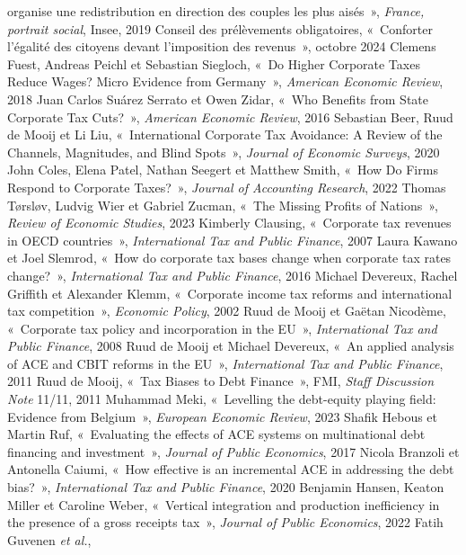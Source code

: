 \documentclass[11pt,a4paper]{article}
\begin{document}
{organise une redistribution en direction des couples les plus aisés~», \emph{France, portrait
social}, Insee, 2019 \textbullet{} Conseil des prélèvements obligatoires, «~Conforter l'égalité des
citoyens devant l'imposition des revenus~», octobre 2024 \textbullet{} Clemens Fuest, Andreas Peichl et Sebastian Siegloch, «~Do Higher
Corporate Taxes Reduce Wages? Micro Evidence from Germany~», \emph{American Economic Review}, 2018
\textbullet{} Juan Carlos Suárez Serrato et Owen Zidar, «~Who Benefits from State Corporate Tax
Cuts?~», \emph{American Economic Review}, 2016 \textbullet{} Sebastian Beer, Ruud de Mooij et Li Liu,
«~International Corporate Tax Avoidance: A Review of the Channels, Magnitudes, and Blind Spots~»,
\emph{Journal of Economic Surveys}, 2020 \textbullet{} John Coles, Elena Patel, Nathan Seegert et
Matthew Smith, «~How Do Firms Respond to Corporate Taxes?~», \emph{Journal of Accounting Research},
2022 \textbullet{} Thomas Tørsløv, Ludvig Wier et Gabriel Zucman, «~The Missing Profits of
Nations~», \emph{Review of Economic Studies}, 2023 \textbullet{} Kimberly Clausing, «~Corporate tax
revenues in OECD countries~», \emph{International Tax and Public Finance}, 2007 \textbullet{} Laura
Kawano et Joel Slemrod, «~How do corporate tax bases change when corporate tax rates change?~»,
\emph{International Tax and Public Finance}, 2016 \textbullet{} Michael Devereux, Rachel Griffith
et Alexander Klemm, «~Corporate income tax reforms and international tax competition~»,
\emph{Economic Policy}, 2002 \textbullet{} Ruud de Mooij et Gaëtan Nicodème, «~Corporate tax policy
and incorporation in the EU~», \emph{International Tax and Public Finance}, 2008 \textbullet{} Ruud
de Mooij et Michael Devereux, «~An applied analysis of ACE and CBIT reforms in the EU~»,
\emph{International Tax and Public Finance}, 2011 \textbullet{} Ruud de Mooij, «~Tax Biases to Debt
Finance~», FMI, \emph{Staff Discussion Note} 11/11, 2011 \textbullet{} Muhammad Meki, «~Levelling
the debt-equity playing field: Evidence from Belgium~», \emph{European Economic Review}, 2023
\textbullet{} Shafik Hebous et Martin Ruf, «~Evaluating the effects of ACE systems on multinational
debt financing and investment~», \emph{Journal of Public Economics}, 2017 \textbullet{} Nicola
Branzoli et Antonella Caiumi, «~How effective is an incremental ACE in addressing the debt bias?~»,
\emph{International Tax and Public Finance}, 2020 \textbullet{} Benjamin Hansen, Keaton Miller et
Caroline Weber, «~Vertical integration and production inefficiency in the presence of a gross
receipts tax~», \emph{Journal of Public Economics}, 2022 \textbullet{} Fatih Guvenen \emph{et al.},
}
\end{document}
